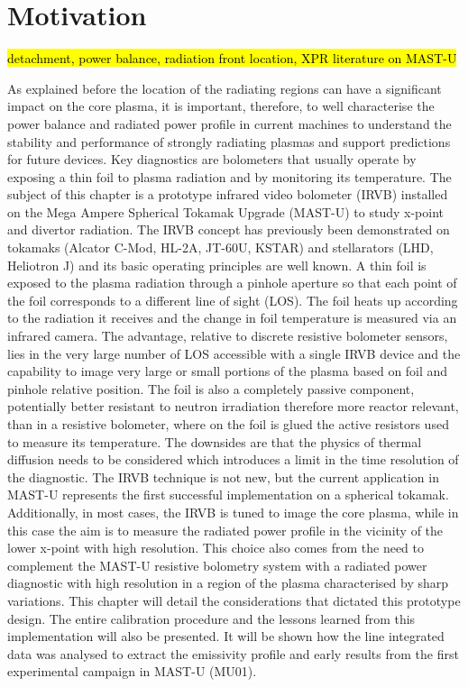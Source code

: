 
\section{Motivation}
\hl{detachment, power balance, radiation front location, XPR literature on MAST-U}


As explained before the location of the radiating regions can have a significant impact on the core plasma\cite{Reimold2015}, it is important, therefore, to well characterise the power balance and radiated power profile in current machines to understand the stability and performance of strongly radiating plasmas and support predictions for future devices. 
Key diagnostics are bolometers that usually operate by exposing a thin foil to plasma radiation and by monitoring its temperature. The subject of this chapter is a prototype infrared video bolometer (IRVB) installed on the Mega Ampere Spherical Tokamak Upgrade (MAST-U) to study x-point and divertor radiation.
The IRVB concept has previously been demonstrated on tokamaks (Alcator C-Mod\cite{Reinke2018a}, HL-2A\cite{Gao2013}, JT-60U\cite{Peterson2007}, KSTAR\cite{Jang2018,Peterson2018}) and stellarators (LHD\cite{Peterson2000,PETERSON2010}, Heliotron J\cite{Miyashita2021}) and its basic operating principles are well known. A thin foil is exposed to the plasma radiation through a pinhole aperture so that each point of the foil corresponds to a different line of sight (LOS). The foil heats up according to the radiation it receives and the change in foil temperature is measured via an infrared camera. The advantage, relative to discrete resistive bolometer sensors\cite{Mast1991}, lies in the very large number of LOS accessible with a single IRVB device and the capability to image very large or small portions of the plasma based on foil and pinhole relative position. The foil is also a completely passive component, potentially better resistant to neutron irradiation therefore more reactor relevant, than in a resistive bolometer, where on the foil is glued the active resistors used to measure its temperature. The downsides are that the physics of thermal diffusion needs to be considered which introduces a limit in the time resolution of the diagnostic. 
The IRVB technique is not new, but the current application in MAST-U represents the first successful implementation on a spherical tokamak. Additionally, in most cases, the IRVB is tuned to image the core plasma, while in this case the aim is to measure the radiated power profile in the vicinity of the lower x-point with high resolution. This choice also comes from the need to complement the MAST-U resistive bolometry system with a radiated power diagnostic with high resolution in a region of the plasma characterised by sharp variations.
This chapter will detail the considerations that dictated this prototype design. The entire calibration procedure and the lessons learned from this implementation will also be presented. It will be shown how the line integrated data was analysed to extract the emissivity profile and early results from the first experimental campaign in MAST-U (MU01).

